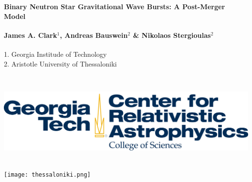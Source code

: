 \documentclass[a0,landscape]{a0poster}
\begin{document}


\begin{minipage}[b]{0.72\linewidth}
\veryHuge \color{NavyBlue} \textbf{Binary Neutron Star Gravitational Wave
Bursts:  A Post-Merger Model} \color{Black}\\ \\%
\huge \textbf{James A. Clark$^{1}$, Andreas Bauswein$^{2}$ \& Nikolaos Stergioulas$^{2}$}\\ \\%
\large 1. Georgia Institude of Technology\\ %
\large 2. Aristotle University of Thessaloniki\\ %
\end{minipage}
%
\hspace{2.5cm}
%
\begin{minipage}[b]{0.25\linewidth}
    \includegraphics[height=5cm]{cra.png} \hspace{1cm}
\texttt{[image: thessaloniki.png]} %
~\\~\\~\\~\\~\\ 
\end{minipage}

\vspace{1cm} %
\end{document}

